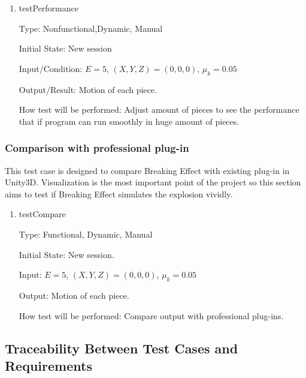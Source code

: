 \documentclass[12pt, titlepage]{article}
\begin{document}
\begin{enumerate}

\item{testPerformance\\}

Type: Nonfunctional,Dynamic, Manual
					
Initial State: New session
					
Input/Condition: $E = 5$, $(X,Y,Z) = (0,0,0)$, $\mu_{k} = 0.05$
					
Output/Result: Motion of each piece.
					
How test will be performed: Adjust amount of pieces to see the performance that if program can run smoothly in huge amount of pieces.

\end{enumerate}

\subsubsection{Comparison with professional plug-in}

This test case is designed to compare Breaking Effect with existing plug-in in Unity3D. Visualization is the most important point of the project so this section aims to test if Breaking Effect simulates the explosion vividly. 

\begin{enumerate}
	
	\item{testCompare\\}
	
	Type: Functional, Dynamic, Manual
	
	Initial State: New session.
	
	Input: $E = 5$, $(X,Y,Z) = (0,0,0)$, $\mu_{k} = 0.05$ 
	
	Output: Motion of each piece.
	
	How test will be performed: Compare output with professional plug-ins. 
	
\end{enumerate}

\subsection{Traceability Between Test Cases and Requirements}
\end{document}
